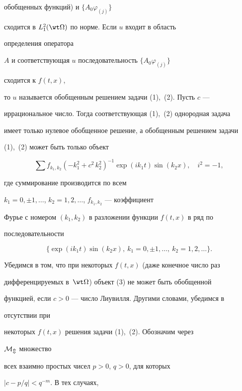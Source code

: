 обобщенных функций) и $\{A_0\varphi_{(j)}\}$ 


сходится в $L^2_1(\wt\Omega)$ по норме. Если $u$ входит в область 


определения оператора 


$A$ и соответствующая $u$ последовательность $\{A_0\varphi_{(j)}\}$ 


сходится к $f(t,x)$, 


то $u$ называется обобщенным решением задачи (1),~(2). Пусть $c$ --- 


иррациональное число. Тогда соответствующая (1),~(2) однородная задача 


имеет только нулевое обобщенное решение, а обобщенным решением задачи 


(1),~(2) может быть только объект 


\begin{equation} 


\sum f_{k_1,k_2}(-k^2_1+c^2\,k^2_2)^{-1}\exp 


(i k_1t)\sin(k_2x),\quad i^2=-1, \tag{3}


\end{equation} 


где суммирование производится по всем 


$k_1=0,\pm1,\dotsc$, $k_2=1,2,\dotsc$, $f_{k_1,k_2}$ --- коэффициент 


Фурье с номером $(k_1,k_2)$ в разложении функции $f(t,x)$ в ряд по 


последовательности 


\begin{equation} 


\{\exp(i k_1t)\sin(k_2x),\ k_1=0,\pm1,\dotsc,\ k_2=1,2,\dotsc\}. \tag{4}


\end{equation} 


Убедимся в том, что при некоторых $f(t,x)$ (даже конечное число раз 


дифференцируемых в~$\wt\Omega$) объект (3) не может быть обобщенной 


функцией, если $c>0$ --- число Лиувилля. Другими словами, убедимся в 


отсутствии при 


некоторых $f(t,x)$ решения задачи (1),~(2). Обозначим через 


$\cal M_m$ множество 


всех взаимно простых чисел $p>0$, $q>0$, для которых 


$|c-p/q|<q^{-m}$. В тех случаях, 


